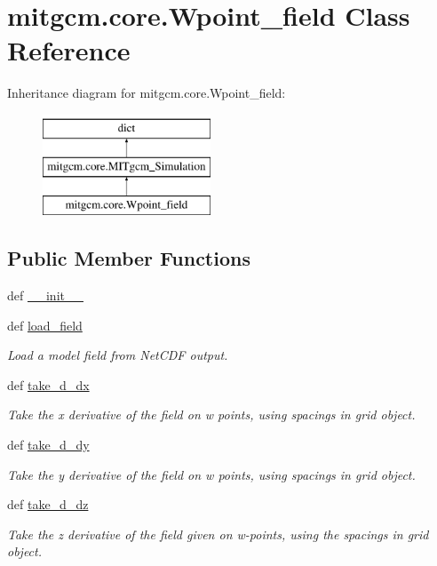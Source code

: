 \hypertarget{classmitgcm_1_1core_1_1Wpoint__field}{\section{mitgcm.\+core.\+Wpoint\+\_\+field Class Reference}
\label{classmitgcm_1_1core_1_1Wpoint__field}
}
Inheritance diagram for mitgcm.\+core.\+Wpoint\+\_\+field\+:\begin{figure}[H]
\begin{center}
\leavevmode
\includegraphics[height=3.000000cm]{classmitgcm_1_1core_1_1Wpoint__field}
\end{center}
\end{figure}
\subsection*{Public Member Functions}
\begin{DoxyCompactItemize}
\item 
def \hyperlink{classmitgcm_1_1core_1_1Wpoint__field_a5149dd8a1c832999bdbcd60b4abc3b14}{\+\_\+\+\_\+init\+\_\+\+\_\+}
\item 
def \hyperlink{classmitgcm_1_1core_1_1Wpoint__field_abc10b27c7fc6fd59b2e525485242d4c1}{load\+\_\+field}
\begin{DoxyCompactList}\small\item\em Load a model field from Net\+C\+D\+F output. \end{DoxyCompactList}\item 
def \hyperlink{classmitgcm_1_1core_1_1Wpoint__field_a3dae400759f1828507a317507dbf681b}{take\+\_\+d\+\_\+dx}
\begin{DoxyCompactList}\small\item\em Take the x derivative of the field on w points, using spacings in grid object. \end{DoxyCompactList}\item 
def \hyperlink{classmitgcm_1_1core_1_1Wpoint__field_a3874bb9811b39ed61b25de3ba3e3c39c}{take\+\_\+d\+\_\+dy}
\begin{DoxyCompactList}\small\item\em Take the y derivative of the field on w points, using spacings in grid object. \end{DoxyCompactList}\item 
def \hyperlink{classmitgcm_1_1core_1_1Wpoint__field_a3f7ffb2f1ed512712805bf78d8a8cde4}{take\+\_\+d\+\_\+dz}
\begin{DoxyCompactList}\small\item\em Take the z derivative of the field given on w-\/points, using the spacings in grid object. \end{DoxyCompactList}\end{DoxyCompactItemize}
